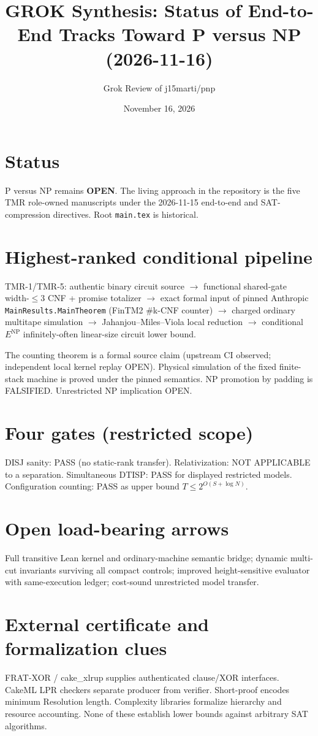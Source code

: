 \documentclass[11pt]{article}
\title{GROK Synthesis: Status of End-to-End Tracks Toward P versus NP (2026-11-16)}
\author{Grok Review of j15marti/pnp}
\date{November 16, 2026}
\begin{document}
\maketitle

\section{Status}
P versus NP remains \textbf{OPEN}. The living approach in the repository is the five TMR role-owned manuscripts under the 2026-11-15 end-to-end and SAT-compression directives. Root \texttt{main.tex} is historical.

\section{Highest-ranked conditional pipeline}
TMR-1/TMR-5: authentic binary circuit source $\to$ functional shared-gate width-$\le$3 CNF + promise totalizer $\to$ exact formal input of pinned Anthropic \texttt{MainResults.MainTheorem} (FinTM2 \#k-CNF counter) $\to$ charged ordinary multitape simulation $\to$ Jahanjou--Miles--Viola local reduction $\to$ conditional $E^{\mathrm{NP}}$ infinitely-often linear-size circuit lower bound.

The counting theorem is a formal source claim (upstream CI observed; independent local kernel replay OPEN). Physical simulation of the fixed finite-stack machine is proved under the pinned semantics. NP promotion by padding is FALSIFIED. Unrestricted NP implication OPEN.

\section{Four gates (restricted scope)}
DISJ sanity: PASS (no static-rank transfer). Relativization: NOT APPLICABLE to a separation. Simultaneous DTISP: PASS for displayed restricted models. Configuration counting: PASS as upper bound $T\le 2^{O(S+\log N)}$.

\section{Open load-bearing arrows}
Full transitive Lean kernel and ordinary-machine semantic bridge; dynamic multi-cut invariants surviving all compact controls; improved height-sensitive evaluator with same-execution ledger; cost-sound unrestricted model transfer.

\section{External certificate and formalization clues}
FRAT-XOR / cake\_xlrup supplies authenticated clause/XOR interfaces. CakeML LPR checkers separate producer from verifier. Short-proof encodes minimum Resolution length. Complexity libraries formalize hierarchy and resource accounting. None of these establish lower bounds against arbitrary SAT algorithms.
\end{document}
